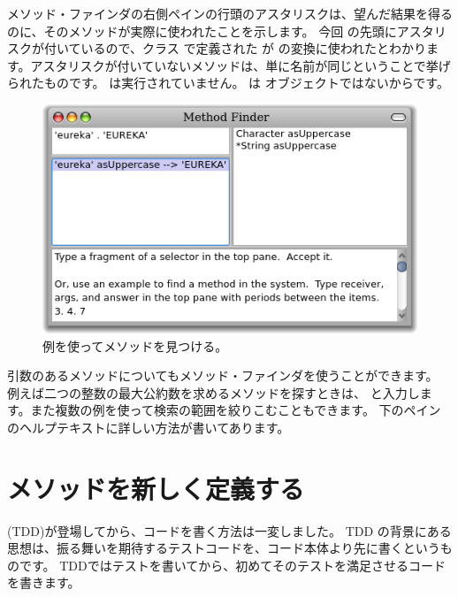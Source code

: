 \documentclass[a4paper,10pt,twoside]{book}
\begin{document}
メソッド・ファインダの右側ペインの行頭のアスタリスクは、望んだ結果を得るのに、そのメソッドが実際に使われたことを示します。
今回  の先頭にアスタリスクが付いているので、クラス  で定義された  が  の変換に使われたとわかります。アスタリスクが付いていないメソッドは、単に名前が同じということで挙げられたものです。 は実行されていません。 は  オブジェクトではないからです。

\begin{figure}[hbt]
\centerline {\includegraphics[width=\textwidth]{MethodFinder-example1}}
\caption{例を使ってメソッドを見つける。
}
\end{figure}

引数のあるメソッドについてもメソッド・ファインダを使うことができます。 例えば二つの整数の最大公約数を求めるメソッドを探すときは、 と入力します。また複数の例を使って検索の範囲を絞りこむこともできます。 下のペインのヘルプテキストに詳しい方法が書いてあります。

\section{メソッドを新しく定義する}

\cite{Beck03a} (TDD)が登場してから、コードを書く方法は一変しました。
TDD の背景にある思想は、振る舞いを期待するテストコードを、コード本体より先に書くというものです。
TDDではテストを書いてから、初めてそのテストを満足させるコードを書きます。
\end{document}
